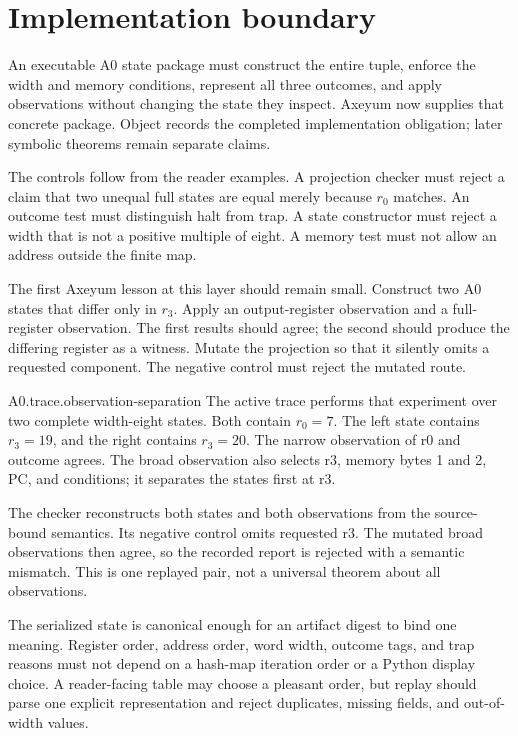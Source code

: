 \section{Implementation boundary}

An executable A0 state package must construct the entire tuple, enforce the
width and memory conditions, represent all three outcomes, and apply
observations without changing the state they inspect. Axeyum now supplies that
concrete package. Object  records the completed
implementation obligation; later symbolic theorems remain separate claims.

The controls follow from the reader examples. A projection checker must reject
a claim that two unequal full states are equal merely because \(r_0\) matches.
An outcome test must distinguish halt from trap. A state constructor must
reject a width that is not a positive multiple of eight. A memory test must
not allow an address outside the finite map.

The first Axeyum lesson at this layer should remain small. Construct two A0
states that differ only in \(r_3\). Apply an output-register observation and a
full-register observation. The first results should agree; the second should
produce the differing register as a witness. Mutate the projection so that it
silently omits a requested component. The negative control must reject the
mutated route.

\begin{artifact}{A0.trace.observation-separation}
The active trace performs that experiment over two complete width-eight
states. Both contain \(r_0=7\). The left state contains \(r_3=19\), and the
right contains \(r_3=20\). The narrow observation of r0 and outcome agrees.
The broad observation also selects r3, memory bytes 1 and 2, PC, and conditions;
it separates the states first at r3.

The checker reconstructs both states and both observations from the
source-bound semantics. Its negative control omits requested r3. The mutated
broad observations then agree, so the recorded report is rejected with a
semantic mismatch. This is one replayed pair, not a universal theorem about
all observations.
\end{artifact}

The serialized state is canonical enough for an artifact digest to
bind one meaning. Register order, address order, word width, outcome tags, and
trap reasons must not depend on a hash-map iteration order or a Python display
choice. A reader-facing table may choose a pleasant order, but replay should
parse one explicit representation and reject duplicates, missing fields, and
out-of-width values.

